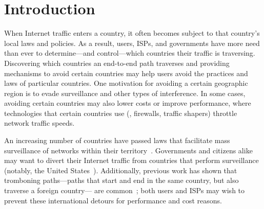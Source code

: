 \section{Introduction}
\label{intro}

When Internet traffic enters a country, it often becomes subject to that country's
local laws and policies.  As a result, users, ISPs, and governments have more need
than ever to determine---and control---which countries their traffic is
traversing.  Discovering which countries an end-to-end path traverses and
providing mechanisms to avoid certain countries may help users avoid the
 practices and laws of particular countries. One motivation for avoiding a certain 
geographic region is to evade surveillance and other types of interference.  In some
cases, avoiding certain countries may also lower costs or improve performance,
where technologies that certain countries use (\eg, firewalls, traffic
shapers) throttle network traffic speeds. 

An increasing number of countries have passed laws that facilitate mass
surveillance of networks within their territory~\cite{france_surveillance,
netherlands_surveillance, kazak_surveillance, uk_bill}. Governments and
citizens alike may want to divert their Internet traffic from countries that
perform surveillance (notably, the United States~\cite{russia_secure_internet,
routing_errors, dte}).   Additionally, previous work has shown that tromboning
paths---paths that start and end in the same country, but also traverse a
foreign country--- are common~\cite{shah2015characterizing, gupta2014peering};
both users and ISPs may wish to prevent these international detours for
performance and cost reasons.

